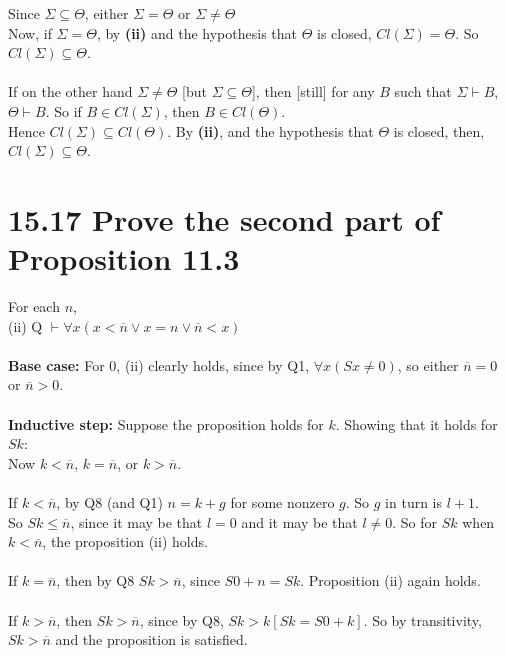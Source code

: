 \documentclass{article}
\begin{document}
Since $\Sigma \subseteq \Theta$, either $\Sigma = \Theta$ or $\Sigma \neq \Theta$\\ Now, if $\Sigma = \Theta$, by  \textbf{(ii)} and the hypothesis that $\Theta$ is closed, $Cl(\Sigma) = \Theta$. So $Cl(\Sigma) \subseteq \Theta$.\\\\
If on the other hand $\Sigma \neq \Theta$ [but $\Sigma \subseteq \Theta$], then [still] for any $B$ such that $\Sigma \vdash B$, $\Theta \vdash B$. So if $B \in Cl(\Sigma)$, then $B \in Cl(\Theta)$.\\
Hence $Cl(\Sigma) \subseteq Cl(\Theta)$. By \textbf{(ii)}, and the hypothesis that $\Theta$ is closed, then, $Cl(\Sigma) \subseteq \Theta$.


\section*{15.17 Prove the second part of Proposition 11.3}
For each $n$,\\
(ii) Q $\vdash \forall x(x < \overline{n} \vee x = n \vee \overline{n} < x)$\\\\
\textbf{Base case:} For 0, (ii) clearly holds, since by Q1, $\forall x (Sx \neq 0)$, so either $\overline{n}=0$ or $\overline{n} > 0$.\\\\
\textbf{Inductive step:} Suppose the proposition holds for $k$. Showing that it holds for $Sk$:\\
Now $k<\overline{n}$,  $k=\overline{n}$, or $k>\overline{n}.$\\\\
If $k<\overline{n}$, by Q8 (and Q1) $n = k + g$ for some nonzero $g$. So $g$ in turn is $l +1$.\\
So $Sk \leq \overline{n}$, since it may be that $l=0$ and it may be that $l \neq 0$. So for $Sk$ when $k<\overline{n}$, the proposition (ii) holds.\\\\
If $k = \overline{n}$, then by Q8 $Sk > \overline{n}$, since $S0 + n = Sk$. Proposition (ii) again holds.\\\\
If $k > \overline{n}$, then $Sk > \overline{n}$, since by Q8, $Sk > k [Sk = S0 +k].$ So by transitivity, $Sk > \overline{n}$ and the proposition is satisfied.
    
\end{document}

